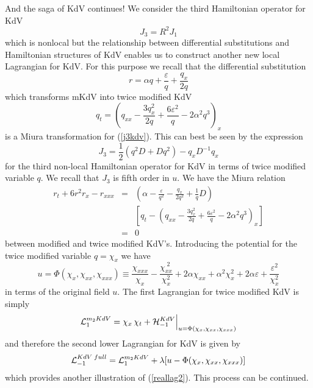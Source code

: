 \documentclass[a4paper,12pt]{article}
\begin{document}
And the saga of KdV continues! We consider the third Hamiltonian
operator for KdV
\begin{equation}
J_3 = R^2 J_1 \label{j3kdv}
\end{equation}
which is nonlocal but the relationship between differential
substitutions and Hamiltonian structures of KdV \cite{max7}
enables us to construct another new local Lagrangian for KdV. For
this purpose we recall that the differential substitution
\begin{equation}
r = \alpha q + \frac{\varepsilon}{q} + \frac{q_x}{2 q}
\end{equation}
which transforms mKdV into twice modified KdV
\begin{equation}
q_t = \left( q_{xx} - \frac{3 q_x^2}{2 q} + \frac{6
\varepsilon^2}{q}  - 2 \alpha^2 q^3 \right)_x
\end{equation}
is a Miura transformation for (\ref{j3kdv}). This can best be seen
by the expression
\begin{equation}
J_3 = \frac{1}{2}( q^2 D + D q^2 ) - q_x D^{-1} q_x
\end{equation}
for the third non-local Hamiltonian operator for KdV in terms of
twice modified variable $q$. We recall that $J_3$ is fifth order
in $u$. We have the Miura relation
\begin{eqnarray} r_t + 6 r^2 r_x - r_{xxx} & = & \left(
\alpha - \frac{\varepsilon}{q^2} - \frac{q_x}{2 q^2} + \frac{1}{q}
D \right) \nonumber \\ && \left[ q_t - \left( q_{xx} - \frac{3
q_x^2}{2 q} + \frac{6 \varepsilon^2}{q} - 2 \alpha^2 q^3 \right)_x
\right] \label{miura3}\\ &=& 0 \nonumber
\end{eqnarray}
between modified and twice modified KdV's. Introducing the
potential for the twice modified variable $q=\chi_x$ we have
\begin{equation}
u = \Phi(\chi_x,\chi_{xx},\chi_{xxx}) \equiv
\frac{\chi_{xxx}}{\chi_x} - \frac{\chi_{xx}^{\;2}}{\chi_x^2} + 2
\alpha \chi_{xx} + \alpha^2 \chi_{x}^2 + 2 \alpha \varepsilon +
\frac{\varepsilon^{2}}{\chi_x^2} \label{uq}
\end{equation}
in terms of the original field $u$. The first Lagrangian for twice
modified KdV is simply
\begin{equation}
{\cal L}_{1}^{m_2KdV} = \chi_{x} \, \chi_{t} + {\cal H}_{-1}^{KdV}
\Big|_{ u = \Phi(\chi_{x}, \chi_{xx},\chi_{xxx} ) }
\label{mmkdvlag}
\end{equation}
and therefore the second lower Lagrangian for KdV is given by
\begin{equation}
{\cal L}_{-1}^{KdV \; full} = {\cal L}_1^{m_2KdV}  + \lambda [ u -
\Phi(\chi_{x}, \chi_{xx}, \chi_{xxx} ) ] \label{kdvlagm2}
\end{equation}
which provides another illustration of (\ref{reallag2}). This
process can be continued.
\end{document}
